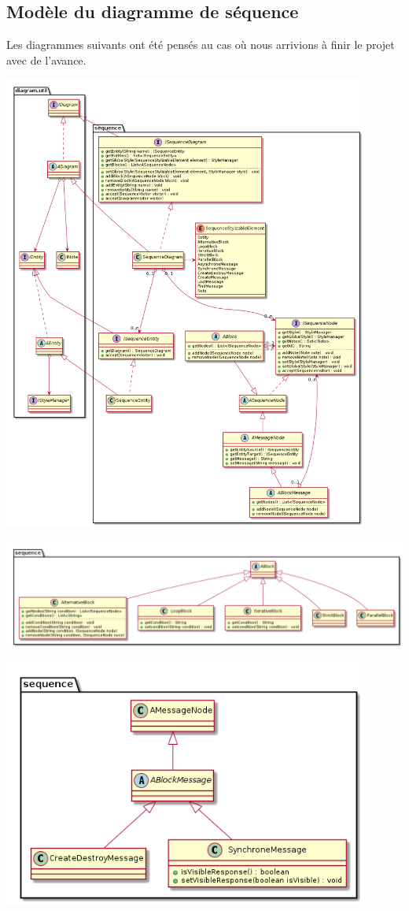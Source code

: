 \documentclass[a4paper,10pt]{article}
\begin{document}
  \subsection{Modèle du diagramme de séquence}
      Les diagrammes suivants ont été pensés au cas où nous arrivions à finir le projet avec de l'avance.
    \begin{center}
	  \includegraphics[width=12cm]{Image/sequence.png}
	\end{center}
	\begin{center}
	  \includegraphics[width=14cm]{Image/sequenceBlock.png}
	\end{center}
	\begin{center}
	  \includegraphics[width=12cm]{Image/sequenceMessageBlock.png}
	\end{center}
\end{document}

